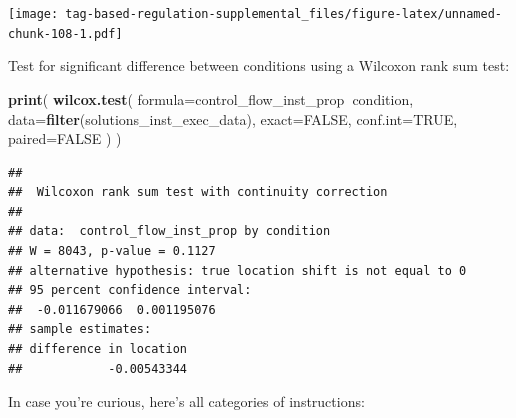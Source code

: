 \documentclass[]{book}
\newenvironment{Shaded}{\begin{snugshade}}{\end{snugshade}}
\newcommand{\DataTypeTok}[1]{\textcolor[rgb]{0.13,0.29,0.53}{#1}}
\newcommand{\KeywordTok}[1]{\textcolor[rgb]{0.13,0.29,0.53}{\textbf{#1}}}
\newcommand{\NormalTok}[1]{#1}
\newcommand{\OperatorTok}[1]{\textcolor[rgb]{0.81,0.36,0.00}{\textbf{#1}}}
\newcommand{\OtherTok}[1]{\textcolor[rgb]{0.56,0.35,0.01}{#1}}
\begin{document}
\texttt{[image: tag-based-regulation-supplemental\_files/figure-latex/unnamed-chunk-108-1.pdf]}

Test for significant difference between conditions using a Wilcoxon rank sum test:

\begin{Shaded}
\begin{Highlighting}[]
\KeywordTok{print}\NormalTok{(}
  \KeywordTok{wilcox.test}\NormalTok{(}
    \DataTypeTok{formula=}\NormalTok{control_flow_inst_prop}\OperatorTok{~}\NormalTok{condition,}
    \DataTypeTok{data=}\KeywordTok{filter}\NormalTok{(solutions_inst_exec_data),}
    \DataTypeTok{exact=}\OtherTok{FALSE}\NormalTok{,}
    \DataTypeTok{conf.int=}\OtherTok{TRUE}\NormalTok{,}
    \DataTypeTok{paired=}\OtherTok{FALSE}
\NormalTok{  )}
\NormalTok{)}
\end{Highlighting}
\end{Shaded}

\begin{verbatim}
## 
##  Wilcoxon rank sum test with continuity correction
## 
## data:  control_flow_inst_prop by condition
## W = 8043, p-value = 0.1127
## alternative hypothesis: true location shift is not equal to 0
## 95 percent confidence interval:
##  -0.011679066  0.001195076
## sample estimates:
## difference in location 
##            -0.00543344
\end{verbatim}

In case you're curious, here's all categories of instructions:
\end{document}
